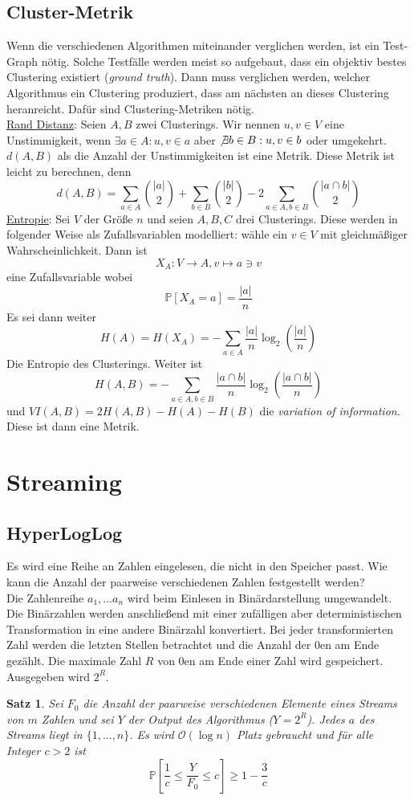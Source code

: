 \documentclass[a4paper, 12pt]{article}
\theoremstyle{plain}
\newtheorem{theorem}{Satz}[subsection] %
\theoremstyle{definition}
\theoremstyle{lemma}
\theoremstyle{remark}
\theoremstyle{corollary}
\theoremstyle{example}
\begin{document}
	\subsection{Cluster-Metrik}
	Wenn die verschiedenen Algorithmen miteinander verglichen werden, ist ein Test-Graph nötig. Solche Testfälle werden meist so aufgebaut, dass ein objektiv bestes Clustering existiert (\textit{ground truth}). Dann muss verglichen werden, welcher Algorithmus ein Clustering produziert, dass am nächsten an dieses Clustering heranreicht. Dafür sind Clustering-Metriken nötig.\\
	\underline{Rand Distanz}: Seien $A,B$ zwei Clusterings. Wir nennen $u,v \in V$ eine Unstimmigkeit, wenn $\exists a \in A: u,v \in a$ aber $\not\exists b \in B: u,v \in b$ oder umgekehrt. $d(A,B)$ als die Anzahl der Unstimmigkeiten ist eine Metrik. Diese Metrik ist leicht zu berechnen, denn \[d(A,B) = \sum_{a \in A} \binom{\left|a\right|}{2} + \sum_{b \in B} \binom{\left|b\right|}{2} - 2\sum_{a\in A, b \in B} \binom{\left|a\cap b\right|}{2}\]
	\underline{Entropie}:
	Sei $V$ der Größe $n$ und seien $A,B,C$ drei Clusterings. Diese werden in folgender Weise als Zufallsvariablen modelliert: wähle ein $v\in V$ mit gleichmäßiger Wahrscheinlichkeit. Dann ist \[X_A: V \to A, v \mapsto a \ni v\] eine Zufallsvariable wobei \[\mathbb{P}[X_A = a] = \frac{\left|a\right|}{n}\] Es sei dann weiter \[H(A) = H(X_A) = -\sum_{a \in A} \frac{\left|a\right|}{n} \log_2\left(\frac{\left|a\right|}{n}\right)\] Die Entropie des Clusterings. Weiter ist \[H(A,B) = -\sum_{a\in A, b \in B} \frac{\left|a \cap b\right|}{n} \log_2\left(\frac{\left|a\cap b\right|}{n}\right)\] und $VI(A,B) = 2H(A,B) - H(A) - H(B)$ die \textit{variation of information}. Diese ist dann eine Metrik.
	\section{Streaming}
	\subsection{HyperLogLog}
	Es wird eine Reihe an Zahlen eingelesen, die nicht in den Speicher passt. Wie kann die Anzahl der paarweise verschiedenen Zahlen festgestellt werden?\\
	Die Zahlenreihe $a_1,...a_n$ wird beim Einlesen in Binärdarstellung umgewandelt. Die Binärzahlen werden anschließend mit einer zufälligen aber deterministischen Transformation in eine andere Binärzahl konvertiert. Bei jeder transformierten Zahl werden die letzten Stellen betrachtet und die Anzahl der 0en am Ende gezählt. Die maximale Zahl $R$ von 0en am Ende einer Zahl wird gespeichert. Ausgegeben wird $2^R$.
	\begin{theorem}
		Sei $F_0$ die Anzahl der paarweise verschiedenen Elemente eines Streams von $m$ Zahlen und sei $Y$ der Output des Algorithmus ($Y=2^R$). Jedes $a$ des Streams liegt in $\{1,...,n\}$. Es wird $\mathcal{O}(\log n)$ Platz gebraucht und für alle Integer $c > 2$ ist \[\mathbb{P}\left[\frac{1}{c} \leq \frac{Y}{F_0}\leq c\right] \geq 1-\frac{3}{c}\] 
	\end{theorem}
\end{document}
